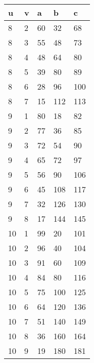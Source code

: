 \documentclass[letterpaper, 12pt]{article}
\theoremstyle{mystyle}
\begin{document}
\begin{tabular}{l l l l l}
    u   & v   & a   & b   & c   \\
    \hline
    8 & 2 & 60 & 32 & 68 \\
    8 & 3 & 55 & 48 & 73 \\
    8 & 4 & 48 & 64 & 80 \\
    8 & 5 & 39 & 80 & 89 \\
    8 & 6 & 28 & 96 & 100 \\
    8 & 7 & 15 & 112 & 113 \\
    9 & 1 & 80 & 18 & 82 \\
    9 & 2 & 77 & 36 & 85 \\
    9 & 3 & 72 & 54 & 90 \\
    9 & 4 & 65 & 72 & 97 \\
    9 & 5 & 56 & 90 & 106 \\
    9 & 6 & 45 & 108 & 117 \\
    9 & 7 & 32 & 126 & 130 \\
    9 & 8 & 17 & 144 & 145 \\
    10 & 1 & 99 & 20 & 101 \\
    10 & 2 & 96 & 40 & 104 \\
    10 & 3 & 91 & 60 & 109 \\
    10 & 4 & 84 & 80 & 116 \\
    10 & 5 & 75 & 100 & 125 \\
    10 & 6 & 64 & 120 & 136 \\
    10 & 7 & 51 & 140 & 149 \\
    10 & 8 & 36 & 160 & 164 \\
    10 & 9 & 19 & 180 & 181 \\
\end{tabular}
\end{document}
